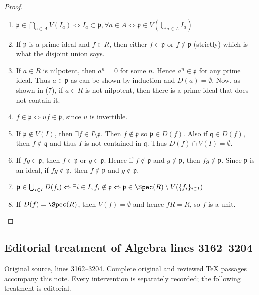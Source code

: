 \begin{proof}
\begin{enumerate}
$I \cap J \subset \mathfrak{p}$, then $IJ \subset \mathfrak{p}$ and hence
either $I \subset \mathfrak{p}$ or $J \subset \mathfrak{p}$, since $\mathfrak{p}$ is prime.
\item $\mathfrak{p} \in \bigcap_{a \in A} V(I_a) \Leftrightarrow
I_a \subset \mathfrak{p}, \forall a \in A \Leftrightarrow
\mathfrak{p} \in V(\bigcup_{a\in A} I_a)$
\item If $\mathfrak{p}$ is a prime ideal and $f \in R$, then either $f \in
\mathfrak{p}$ or $f \notin \mathfrak{p}$ (strictly) which is what the disjoint
union says.
\item If $a \in R$ is nilpotent, then $a^n = 0$ for some $n$. Hence $a^n \in
\mathfrak{p}$ for any prime ideal. Thus $a \in \mathfrak{p}$ as can be shown by
induction and $D(a) = \emptyset$. Now, as shown in (7), if $a \in R$ is not
nilpotent, then there is a prime ideal that does not contain it.
\item $f \in \mathfrak{p} \Leftrightarrow uf \in \mathfrak{p}$, since $u$ is
invertible.
\item If $\mathfrak{p} \notin V(I)$, then $\exists f \in I \setminus
\mathfrak{p}$. Then $f \notin \mathfrak{p}$ so $\mathfrak{p} \in D(f)$. Also if
$\mathfrak{q} \in D(f)$, then $f \notin \mathfrak{q}$ and thus $I$ is not
contained in $\mathfrak{q}$. Thus $D(f) \cap V(I) = \emptyset$.
\item If $fg \in \mathfrak{p}$, then $f \in \mathfrak{p}$ or $g \in
\mathfrak{p}$. Hence if $f \notin \mathfrak{p}$ and $g \notin \mathfrak{p}$,
then $fg \notin \mathfrak{p}$. Since $\mathfrak{p}$ is an ideal, if $fg \notin
\mathfrak{p}$, then $f \notin \mathfrak{p}$ and $g \notin \mathfrak{p}$.
\item $\mathfrak{p} \in \bigcup_{i \in I} D(f_i) \Leftrightarrow \exists i \in
I, f_i \notin \mathfrak{p} \Leftrightarrow \mathfrak{p} \in \Spec(R)
\setminus V(\{f_i\}_{i \in I})$
\item If $D(f) = \Spec(R)$, then $V(f) = \emptyset$ and
hence $fR = R$, so $f$ is a unit.
\end{enumerate}
\end{proof}


\subsection{Editorial treatment of Algebra lines 3162--3204}

\hypertarget{algebra-context-013}{}

\noindent\href{https://github.com/stacks/stacks-project/blob/a04446e57ec1fbc252a871afcec7752fb2807b14/algebra.tex\#L3162}{Original source, lines 3162--3204}. Complete original and reviewed TeX passages accompany this note. Every intervention is separately recorded; the following treatment is editorial.


